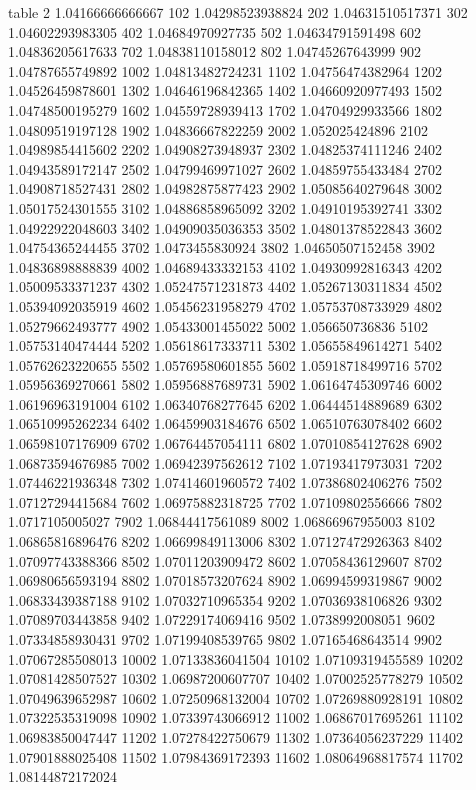 table {%
2 1.04166666666667
102 1.04298523938824
202 1.04631510517371
302 1.04602293983305
402 1.04684970927735
502 1.04634791591498
602 1.04836205617633
702 1.04838110158012
802 1.04745267643999
902 1.04787655749892
1002 1.04813482724231
1102 1.04756474382964
1202 1.04526459878601
1302 1.04646196842365
1402 1.04660920977493
1502 1.04748500195279
1602 1.04559728939413
1702 1.04704929933566
1802 1.04809519197128
1902 1.04836667822259
2002 1.052025424896
2102 1.04989854415602
2202 1.04908273948937
2302 1.04825374111246
2402 1.04943589172147
2502 1.04799469971027
2602 1.04859755433484
2702 1.04908718527431
2802 1.04982875877423
2902 1.05085640279648
3002 1.05017524301555
3102 1.04886858965092
3202 1.04910195392741
3302 1.04922922048603
3402 1.04909035036353
3502 1.04801378522843
3602 1.04754365244455
3702 1.0473455830924
3802 1.04650507152458
3902 1.04836898888839
4002 1.04689433332153
4102 1.04930992816343
4202 1.05009533371237
4302 1.05247571231873
4402 1.05267130311834
4502 1.05394092035919
4602 1.05456231958279
4702 1.05753708733929
4802 1.05279662493777
4902 1.05433001455022
5002 1.056650736836
5102 1.05753140474444
5202 1.05618617333711
5302 1.05655849614271
5402 1.05762623220655
5502 1.05769580601855
5602 1.05918718499716
5702 1.05956369270661
5802 1.05956887689731
5902 1.06164745309746
6002 1.06196963191004
6102 1.06340768277645
6202 1.06444514889689
6302 1.06510995262234
6402 1.06459903184676
6502 1.06510763078402
6602 1.06598107176909
6702 1.06764457054111
6802 1.07010854127628
6902 1.06873594676985
7002 1.06942397562612
7102 1.07193417973031
7202 1.07446221936348
7302 1.07414601960572
7402 1.07386802406276
7502 1.07127294415684
7602 1.06975882318725
7702 1.07109802556666
7802 1.0717105005027
7902 1.06844417561089
8002 1.06866967955003
8102 1.06865816896476
8202 1.06699849113006
8302 1.07127472926363
8402 1.07097743388366
8502 1.07011203909472
8602 1.07058436129607
8702 1.06980656593194
8802 1.07018573207624
8902 1.06994599319867
9002 1.06833439387188
9102 1.07032710965354
9202 1.07036938106826
9302 1.07089703443858
9402 1.07229174069416
9502 1.0738992008051
9602 1.07334858930431
9702 1.07199408539765
9802 1.07165468643514
9902 1.07067285508013
10002 1.07133836041504
10102 1.07109319455589
10202 1.07081428507527
10302 1.06987200607707
10402 1.07002525778279
10502 1.07049639652987
10602 1.07250968132004
10702 1.07269880928191
10802 1.07322535319098
10902 1.07339743066912
11002 1.06867017695261
11102 1.06983850047447
11202 1.07278422750679
11302 1.07364056237229
11402 1.07901888025408
11502 1.07984369172393
11602 1.08064968817574
11702 1.08144872172024
}
